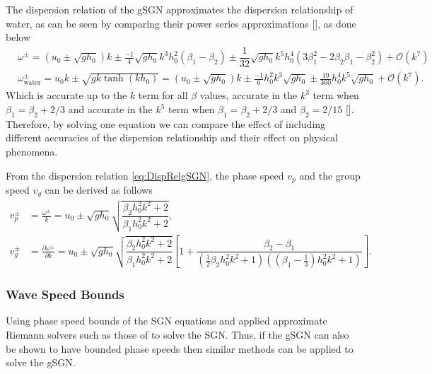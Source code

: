 \documentclass[10pt]{elsarticle}
\begin{document}
The dispersion relation of the gSGN approximates the dispersion relationship of water, as can be seen by comparing their power series approximations [], as done below
\begin{align}
&\omega^\pm = \left(u_0 \pm \sqrt{gh_0}\right) k \pm  \frac{-1}{4}\sqrt{gh_0} k^3 h_0^2 \left(\beta_1 - \beta_2\right) \pm \dfrac{1}{32} \sqrt{gh_0} k^5 h_0^4\left(3 \beta_1^2 -  2 \beta_2 \beta_1 -\beta_2^2 \right) + \mathcal{O}\left(k^7\right) \\
&\omega^\pm_{\text{water}} = u_0 k \pm \sqrt{gk \tanh\left(k h_0\right)} = \left(u_0 \pm \sqrt{gh_0}\right) k \pm  \frac{-1}{6} h_0^2 k^3 \sqrt{gh_0} \pm \frac{19}{360} h_0^4 k^5 \sqrt{gh_0} + \mathcal{O}\left(k^7\right).
\end{align}
Which is accurate up to the $k$ term for all $\beta$ values, accurate in the $k^3$ term when $\beta_1 = \beta_2 + 2/3$ and accurate in the $k^5$ term when $\beta_1 = \beta_2 + 2/3$ and $\beta_2 = 2/15$ []. Therefore, by solving one equation we can compare the effect of including different accuracies of the dispersion relationship and their effect on physical phenomena. 



From the dispersion relation \eqref{eq:DispRelgSGN}, the phase speed $v_p$ and the group speed $v_g$ can be derived as follows
\begin{subequations}
\begin{align}
v^\pm_p &= \frac{\omega^\pm}{k} = u_0 \pm  \sqrt{gh_0} \sqrt{\dfrac{\beta_2 h_0^2 k^2 + 2}{\beta_1 h_0^2 k^2 + 2} },\\
v^\pm_g &= \frac{\partial \omega^\pm }{\partial k}= u_0  \pm  \sqrt{gh_0} \sqrt{\dfrac{\beta_2 h_0^2 k^2 + 2}{ \beta_1 h_0^2 k^2 + 2} } \left[1 +  \dfrac{\beta_2 - \beta_1 }{\left(\frac{1}{2}\beta_2 h_0^2 k^2 +1\right)\left( \left( \beta_1 - \frac{1}{3}\right) h_0^2 k^2 + 1\right)}\right].
\end{align}
\label{eq:wavespeeds}
\end{subequations}


\subsubsection{Wave Speed Bounds}
Using phase speed bounds of the SGN equations \citet{Hank-etal-2010-2034} and \citet{Zoppou-etal-2017} applied approximate Riemann solvers such as those of \citet{Kurganov-etal-2001-707} to solve the SGN. Thus, if the gSGN can also be shown to have bounded phase speeds then similar methods can be applied to solve the gSGN. 
\end{document}

